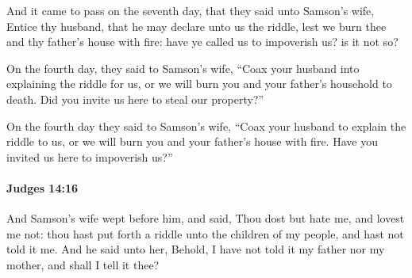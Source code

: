 			\begin{versebox}
					\item[BHS] 
					\item[ASV] And it came to pass on the seventh day, that they said unto Samson's wife, Entice thy husband, that he may declare unto us the riddle, lest we burn thee and thy father's house with fire: have ye called us to impoverish us? is it not so?
					\item[NIV] On the fourth day, they said to Samson’s wife, “Coax your husband into explaining the riddle for us, or we will burn you and your father’s household to death. Did you invite us here to steal our property?”
					\item[NRSV] On the fourth day they said to Samson’s wife, “Coax your husband to explain the riddle to us, or we will burn you and your father’s house with fire. Have you invited us here to impoverish us?”
			\end{versebox}

		\paragraph{Judges 14:16} %
			\label{JUDGES-14-16}

			And Samson’s wife wept before him, and said, Thou dost but hate me, and lovest me not: thou hast put forth a riddle unto the children of my people, and hast not told it me. And he said unto her, Behold, I have not told it my father nor my mother, and shall I tell it thee?


